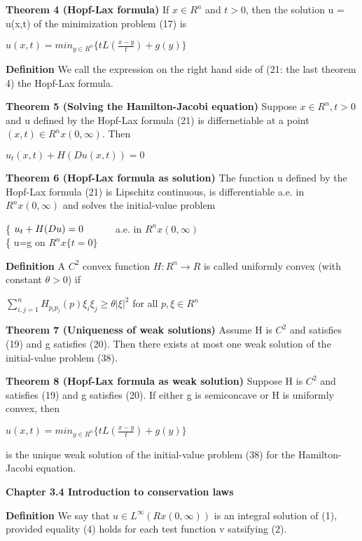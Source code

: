 \documentclass{article}
\newcommand\tab[1][1cm]{\hspace*{#1}}
\begin{document}
\textbf {Theorem 4 (Hopf-Lax formula)} If $x \in R^n$ and $t > 0$, then the solution u = u(x,t) of the minimization problem (17) is
\begin{center}
$u(x,t) = min_{y \in R^n} \{ tL (\frac{x-y}{t}) + g(y) \}$
\end{center}

\textbf {Definition} We call the expression on the right hand side of (21: the last theorem 4) the Hopf-Lax formula.

\textbf {Theorem 5 (Solving the Hamilton-Jacobi equation)} Suppose $x \in R^n, t > 0$ and u defined by the Hopf-Lax formula (21) is differnetiable at a point $(x,t) \in R^n x (0, \infty)$. Then
\begin{center}
$u_t(x,t) + H(Du(x,t)) = 0$
\end{center}

\textbf {Theorem 6 (Hopf-Lax formula as solution)} The function u defined by the Hopf-Lax formula (21) is Lipschitz continuous, is differentiable a.e. in $R^n x (0, \infty)$ and solves the initial-value problem
\begin{center}
\{ $u_t + H(Du) = 0 \tab$ a.e. in $R^n x (0, \infty)$ \\
\{ \tab u=g \tab on $R^n x \{t=0\}$
\end{center}

\textbf {Definition} A $C^2$ convex function $H: R^n \to R$ is called uniformly convex (with constant $\theta > 0$) if 
\begin{center}
$\sum_{i,j=1}^n H_{p_{i}p_{j}} (p) \xi_i \xi_j \geq \theta |\xi|^2$ \tab for all $p, \xi \in R^n$
\end{center}

\textbf {Theorem 7 (Uniqueness of weak solutions)} Assume H is $C^2$ and satisfies (19) and g satisfies (20). Then there exists at most one weak solution of the initial-value problem (38).

\textbf {Theorem 8 (Hopf-Lax formula as weak solution)} Suppose H is $C^2$ and satisfies (19) and g satisfies (20). If either g is semiconcave or H is uniformly convex, then
\begin{center}
$u(x,t) = min_{y \in R^n} \{tL ( \frac{x-y}{t}) + g(y) \}$
\end{center}
is the unique weak solution of the initial-value problem (38) for the Hamilton-Jacobi equation.

\textbf {Chapter 3.4 Introduction to conservation laws}

\textbf {Definition} We say that $u \in L^\infty(R x (0, \infty))$ is an integral solution of (1), provided equality (4) holds for each test function v satsifying (2).
\end{document}
